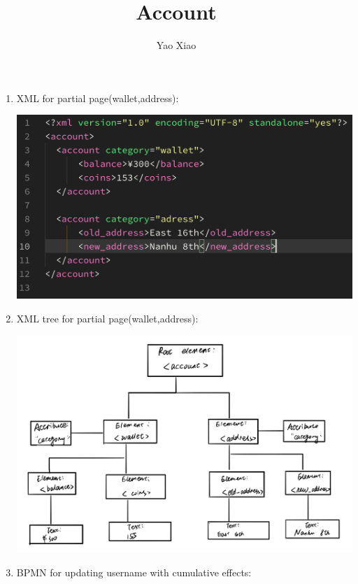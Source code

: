 \documentclass[11pt]{article}
\begin{document}
\author{Yao Xiao}
\title{Account}
\maketitle

\medskip

\begin{enumerate}


\item 
XML for partial page(wallet,address):

\includegraphics[scale=0.6]{Figure4-1.png}

\item 
XML tree for partial page(wallet,address):

\includegraphics[scale=0.3]{Figure4-2.jpeg}

\item 
BPMN for updating username with cumulative effects:


\end{enumerate}
\end{document}
